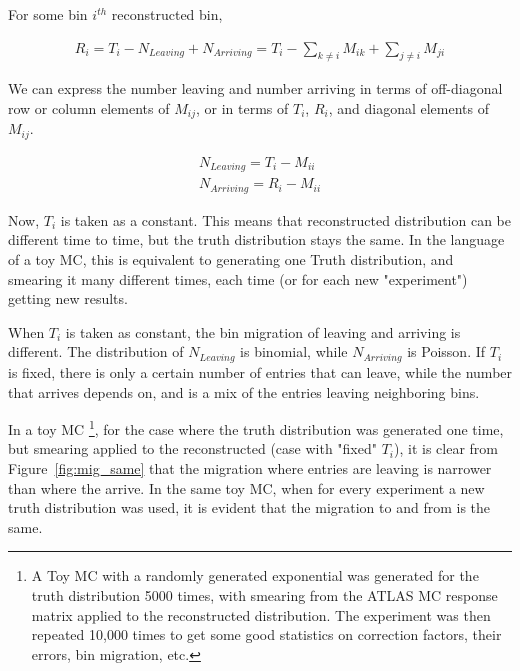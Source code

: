 For some bin $i^{th}$ reconstructed bin,

\begin{eqnarray} \label{eq:leavearrive}
R_{i} = T_{i} - N_{Leaving} + N_{Arriving} = T_{i} - \sum_{k\neq i}^{}M_{ik} + \sum_{j\neq i}^{}M_{ji}
\end{eqnarray}

We can express the number leaving and number arriving in terms of off-diagonal row or column elements of $M_{ij}$, or in terms of  $T_{i}$, $R_{i}$, and diagonal elements of  $M_{ij}$.

\begin{eqnarray} \label{eq:leavearrivediagonal}
N_{Leaving} = T_{i} - M_{ii} \\
N_{Arriving} = R_{i} - M_{ii} 
\end{eqnarray}

Now, $T_{i}$ is taken as a constant. This means that reconstructed distribution can be different time to time, but the truth distribution stays the same. In the language of a toy MC, this is equivalent to generating one Truth distribution, and smearing it many different times, each time (or for each new "experiment") getting new results.

When $T_{i}$ is taken as constant, the bin migration of leaving and arriving is different. The distribution of $N_{Leaving}$ is binomial, while $N_{Arriving}$ is Poisson. If $T_{i}$ is fixed, there is only a certain number of entries that can leave, while the number that arrives depends on, and is a mix of the entries leaving neighboring bins. 

In a toy MC \footnote{A Toy MC with a randomly generated exponential was generated for the truth distribution 5000 times, with smearing from the ATLAS MC response matrix applied to the reconstructed distribution. The experiment was then repeated 10,000 times to get some good statistics on correction factors, their errors, bin migration, etc.}, for the case where the truth distribution was generated one time, but smearing applied to the reconstructed (case with "fixed" $T_{i}$), it is clear from Figure~\ref{fig:mig_same} that the migration where entries are leaving is narrower than where the arrive. In the same toy MC, when for every experiment a new truth distribution was used, it is evident that the migration to and from is the same.

